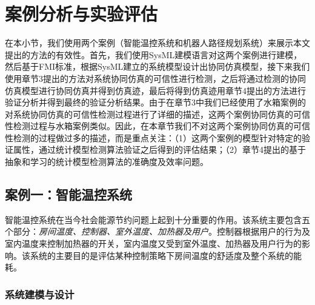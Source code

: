 \chapter{案例分析与实验评估}
\label{ch6}
在本小节，我们使用两个案例（智能温控系统\cite{David2012An}和机器人路径规划系统\cite{Lahijanian2010Motion}）来展示本文提出的方法的有效性。首先，我们使用SysML建模语言对这两个案例进行建模，然后基于FMI标准，根据SysML建立的系统模型设计出协同仿真模型，接下来我们使用章节3提出的方法对系统协同仿真的可信性进行检测，之后将通过检测的协同仿真模型进行协同仿真并得到仿真迹，最后将得到仿真迹用章节4提出的方法进行验证分析并得到最终的验证分析结果。由于在章节3中我们已经使用了水箱案例的对系统协同仿真的可信性检测过程进行了详细的描述，这两个案例协同仿真的可信性检测过程与水箱案例类似。因此，在本章节我们不对这两个案例协同仿真的可信性检测的过程做过多的描述，而是重点关注：（1）这两个案例的模型针对特定的验证属性，通过统计模型检测算法验证之后得到的评估结果；（2）章节4提出的基于抽象和学习的统计模型检测算法的准确度及效率问题。
\section{案例一：智能温控系统}
智能温控系统在当今社会能源节约问题上起到十分重要的作用。该系统主要包含五个部分：\emph{房间温度、控制器、室外温度、加热器及用户}。控制器根据用户的行为及室内温度来控制加热器的开关，室内温度又受到室外温度、加热器及用户行为的影响。该系统的主要目的是评估某种控制策略下房间温度的舒适度及整个系统的能耗。
\subsection{系统建模与设计}

